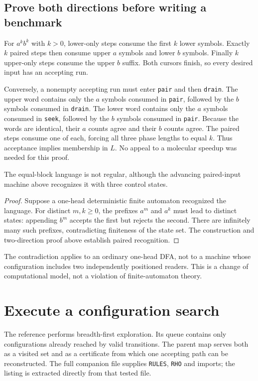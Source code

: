 \subsection{Prove both directions before writing a benchmark}
For $a^k b^k$ with $k>0$, lower-only steps consume the first $k$ lower
symbols. Exactly $k$ paired steps then consume upper $a$ symbols and lower
$b$ symbols. Finally $k$ upper-only steps consume the upper $b$ suffix.
Both cursors finish, so every desired input has an accepting run.

Conversely, a nonempty accepting run must enter \texttt{pair} and then
\texttt{drain}. The upper word contains only the $a$ symbols consumed in
\texttt{pair}, followed by the $b$ symbols consumed in \texttt{drain}.
The lower word contains only the $a$ symbols consumed in \texttt{seek},
followed by the $b$ symbols consumed in \texttt{pair}. Because the words
are identical, their $a$ counts agree and their $b$ counts agree. The paired
steps consume one of each, forcing all three phase lengths to equal $k$.
Thus acceptance implies membership in $L$. No appeal to a molecular speedup
was needed for this proof.

\begin{proposition}
The equal-block language is not regular, although the advancing paired-input
machine above recognizes it with three control states.
\end{proposition}
\begin{proof}
Suppose a one-head deterministic finite automaton recognized the language.
For distinct $m,k\geq0$, the prefixes $a^m$ and $a^k$ must lead to distinct
states: appending $b^m$ accepts the first but rejects the second. There are
infinitely many such prefixes, contradicting finiteness of the state set.
The construction and two-direction proof above establish paired recognition.
\end{proof}
The contradiction applies to an ordinary one-head DFA, not to a machine
whose configuration includes two independently positioned readers. This is
a change of computational model, not a violation of finite-automaton theory.



\section{Execute a configuration search}
The reference performs breadth-first exploration. Its queue contains only
configurations already reached by valid transitions. The parent map serves
both as a visited set and as a certificate from which one accepting path can
be reconstructed. The full companion file supplies \texttt{RULES}, \texttt{RHO}
and imports; the listing is extracted directly from that tested file.

